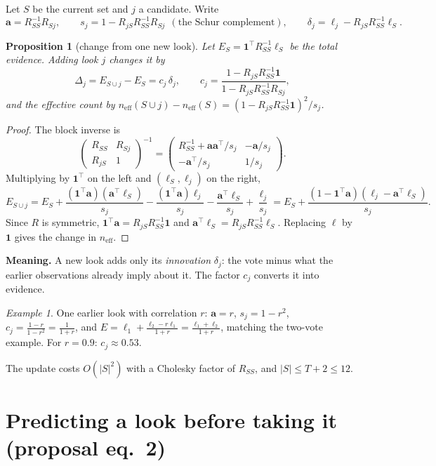 \documentclass[11pt]{article}
\theoremstyle{plain}
\newtheorem{prop}{Proposition}
\theoremstyle{remark}
\newtheorem*{ex}{Example}
\newcommand{\one}{\mathbf{1}}
\begin{document}
Let $S$ be the current set and $j$ a candidate. Write
\[ \bm a=R_{SS}^{-1}R_{Sj},\qquad s_j=1-R_{jS}R_{SS}^{-1}R_{Sj}\ \ (\text{the Schur complement}),\qquad \delta_j=\ell_j-R_{jS}R_{SS}^{-1}\bm\ell_S . \]

\begin{prop}[change from one new look]\label{prop:update}
Let $E_S=\one^\top R_{SS}^{-1}\bm\ell_S$ be the total evidence. Adding look $j$ changes it by
\[ \Delta_j = E_{S\cup j}-E_S = c_j\,\delta_j,\qquad c_j=\frac{1-R_{jS}R_{SS}^{-1}\one}{1-R_{jS}R_{SS}^{-1}R_{Sj}}, \]
and the effective count by $n_{\text{eff}}(S\cup j)-n_{\text{eff}}(S)=(1-R_{jS}R_{SS}^{-1}\one)^2/s_j$.
\end{prop}
\begin{proof}
The block inverse is
\[ \begin{pmatrix}R_{SS}&R_{Sj}\\R_{jS}&1\end{pmatrix}^{-1}=\begin{pmatrix}R_{SS}^{-1}+\bm a\bm a^\top/s_j & -\bm a/s_j\\ -\bm a^\top/s_j & 1/s_j\end{pmatrix}. \]
Multiplying by $\one^\top$ on the left and $(\bm\ell_S,\ell_j)$ on the right,
\[ E_{S\cup j}=E_S+\frac{(\one^\top\bm a)(\bm a^\top\bm\ell_S)}{s_j}-\frac{(\one^\top\bm a)\ell_j}{s_j}-\frac{\bm a^\top\bm\ell_S}{s_j}+\frac{\ell_j}{s_j}
=E_S+\frac{(1-\one^\top\bm a)(\ell_j-\bm a^\top\bm\ell_S)}{s_j}. \]
Since $R$ is symmetric, $\one^\top\bm a=R_{jS}R_{SS}^{-1}\one$ and $\bm a^\top\bm\ell_S=R_{jS}R_{SS}^{-1}\bm\ell_S$. Replacing $\bm\ell$ by $\one$ gives the change in $n_{\text{eff}}$.
\end{proof}

\textbf{Meaning.} A new look adds only its \emph{innovation} $\delta_j$: the vote minus what the earlier observations already imply about it. The factor $c_j$ converts it into evidence.

\begin{ex}
One earlier look with correlation $r$: $\bm a=r$, $s_j=1-r^2$, $c_j=\frac{1-r}{1-r^2}=\frac{1}{1+r}$, and $E=\ell_1+\frac{\ell_2-r\ell_1}{1+r}=\frac{\ell_1+\ell_2}{1+r}$, matching the two-vote example. For $r=0.9$: $c_j\approx0.53$.
\end{ex}

The update costs $O(|S|^2)$ with a Cholesky factor of $R_{SS}$, and $|S|\le T+2\le12$.

\section{Predicting a look before taking it (proposal eq.~2)}
\end{document}
